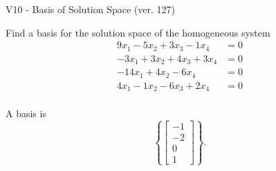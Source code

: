 \begin{exercise}
  \begin{exerciseTitle}V10 - Basis of Solution Space (ver. 127)\end{exerciseTitle}
  \begin{exerciseStatement}
    Find a basis for the solution space of the homogeneous system 
\begin{align*}
 9 x_ 1 -5 x_ 2 + 3 x_ 3 -1 x_ 4 &= 0  \\ 
  -3 x_ 1 + 3 x_ 2 + 4 x_ 3 + 3 x_ 4 &= 0  \\ 
  -14 x_ 1 + 4 x_ 2 -6 x_ 4 &= 0  \\ 
  4 x_ 1 -1 x_ 2 -6 x_ 3 + 2 x_ 4 &= 0  \\ 
 \end{align*}


 
  \end{exerciseStatement}

  \begin{exerciseAnswer}
   A basis is   
\[\left\{\left[\begin{array}{c}
-1 \\
-2 \\
0 \\
1
\end{array}\right]\right\}.\]

  


  \end{exerciseAnswer}
\end{exercise}